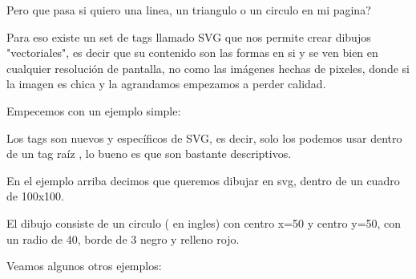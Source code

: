 \documentclass[letterpaper,10pt,spanish]{sphinxmanual}
\begin{document}
Pero que pasa si quiero una linea, un triangulo o un circulo en mi pagina?

Para eso existe un set de tags llamado SVG que nos permite crear dibujos
"vectoriales", es decir que su contenido son las formas en si y se ven bien en
cualquier resolución de pantalla, no como las imágenes hechas de pixeles, donde
si la imagen es chica y la agrandamos empezamos a perder calidad.

Empecemos con un ejemplo simple:

%
\begin{sphinxVerbatim}[commandchars=\\\{\}]
  
           
\end{sphinxVerbatim}



Los tags son nuevos y específicos de SVG, es decir, solo los podemos usar dentro
de un tag raíz ,
lo bueno es que son bastante descriptivos.

En el ejemplo arriba decimos que queremos dibujar en svg, dentro de un cuadro
de 100x100.

El dibujo consiste de un circulo ( en ingles) con centro x=50 y centro y=50, con un radio de
40, borde de 3 negro y relleno rojo.

Veamos algunos otros ejemplos:

%
\begin{sphinxVerbatim}[commandchars=\\\{\}]
  
          
\end{sphinxVerbatim}
\end{document}
